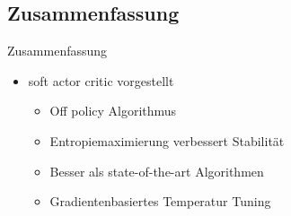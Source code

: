 

\subsection{Zusammenfassung}
\begin{frame}{Zusammenfassung}
        \begin{itemize}
            \item soft actor critic vorgestellt
            \begin{itemize}
                \item Off policy Algorithmus
                \item Entropiemaximierung verbessert Stabilität
                \item Besser als state-of-the-art Algorithmen 
                \item Gradientenbasiertes Temperatur Tuning
            \end{itemize} 
        \end{itemize}
\end{frame}

